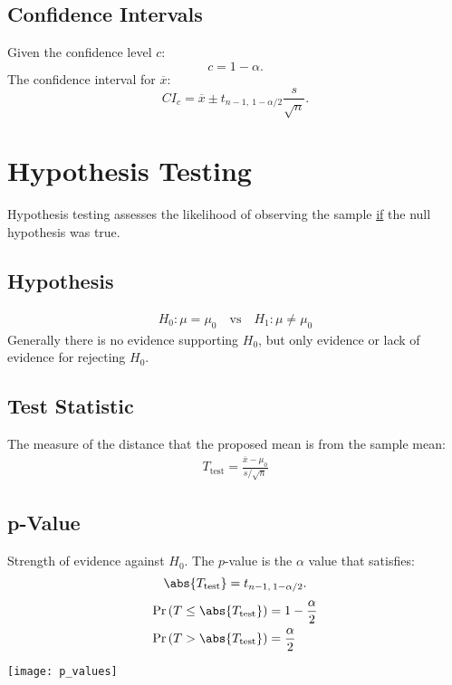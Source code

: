 \documentclass{article}
\begin{document}
\begin{minipage}{126.1962963mm}
    \begin{multicols*}{2}
        \subsection*{Confidence Intervals}
        Given the confidence level \(c\):
        \begin{equation*}
            c = 1 - \alpha.
        \end{equation*}
        The confidence interval for \(\overline{x}\):
        \begin{equation*}
            {CI}_{c} = \overline{x} \pm t_{n-1,\: 1-\alpha/2} \frac{s}{\sqrt{n}}.
        \end{equation*}
        \section*{Hypothesis Testing}
        Hypothesis testing assesses the likelihood of observing the sample \underline{if} the null hypothesis was true.
        \subsection*{Hypothesis}
        \begin{align*}
            H_0:\mu = \mu_0 \quad \text{vs} \quad H_1:\mu \neq \mu_0
        \end{align*}
        Generally there is no evidence supporting \(H_0\), but only evidence or lack of evidence for rejecting \(H_0\).
        \subsection*{Test Statistic}
        The measure of the distance that the proposed mean is from the sample mean:
        \begin{align*}
            T_{\text{test}} = \frac{\overline{x} - \mu_0}{s/\sqrt{n}}
        \end{align*}
        \subsection*{p-Value}
        Strength of evidence against \(H_0\). The \(p\)-value is the \(\alpha\) value that satisfies:
        \begin{equation*}
            \abs{T_{\text{test}}} = t_{n-1,\: 1-\alpha/2}.
        \end{equation*}
        \begin{align*}
            \Pr{\left( T \leq \abs{T_{\text{test}}} \right)} & = 1 - \frac{\alpha}{2} \\
            \Pr{\left( T > \abs{T_{\text{test}}} \right)}    & = \frac{\alpha}{2}
        \end{align*}
    \end{multicols*}
    \texttt{[image: p\_values]}
\end{minipage}
\end{document}
